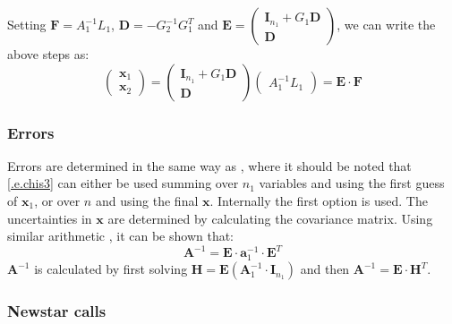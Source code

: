 Setting $\mathbf{F}=A_{1}^{-1}L_{1}$, $\mathbf{D}=-G_{2}^{-1}G_{1}^{T}$
and $\mathbf{E} = \left(\begin{array}{c}\mathbf{I}_{n_{1}}+G_{1}\mathbf{D} \\
\mathbf{D}              \end{array}\right)$, we can write the above steps as:
\begin{equation}
	\left(\begin{array}{c}
		\mathbf{x}_{1} \\ \mathbf{x}_{2}
	      \end{array}\right) =
	\left(\begin{array}{c}
	      \mathbf{I}_{n_{1}}+G_{1}\mathbf{D} \\ \mathbf{D}
	      \end{array}\right)
	\left(\begin{array}{c}
	      A_{1}^{-1}L_{1}
	      \end{array}\right) = \mathbf{E}\cdot\mathbf{F}
\end{equation}

\subsubsection{Errors}

Errors are determined in the same way as ,
where it should be noted that \eqref{.e.chis3} can
either be used summing over $n_{1}$ variables and using the first guess of
$\mathbf{x}_{1}$, or over $n$ and using the final $\mathbf{x}$. Internally
the first option is used.
The uncertainties in $\mathbf{x}$ are determined by calculating the
covariance matrix. Using similar arithmetic , it
can be shown that:
\begin{equation}
	\mathbf{A}^{-1}=\mathbf{E}\cdot\mathbf{a}_{1}^{-1}\cdot\mathbf{E}^{T}
\end{equation}
$\mathbf{A}^{-1}$ is calculated by first solving
$\mathbf{H}=\mathbf{E}\left(\mathbf{A}_{1}^{-1}
\cdot\mathbf{I}_{n_{1}}\right)$
and then $\mathbf{A}^{-1} = \mathbf{E}\cdot\mathbf{H}^{T}$.

\subsubsection{Newstar calls}

